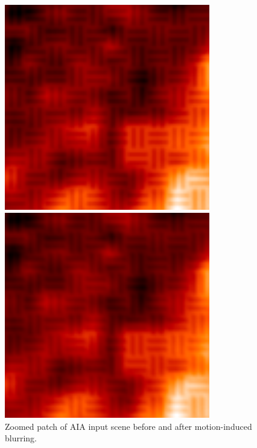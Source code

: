 \documentclass[tocnosub,noragright,centerchapter,12pt]{uiucecethesis09}
\begin{document}
\begin{figure}
  \centering
  \begin{minipage}{.5\textwidth}
    \centering
    \includegraphics[width=0.8\textwidth]{figures/aia_modulate_zoom_blur.png}
  \end{minipage}%
  \begin{minipage}{.5\textwidth}
    \centering
    \includegraphics[width=0.8\textwidth]{figures/aia_modulate_zoom_blur_blur.png}
  \end{minipage}
  \caption{Zoomed patch of AIA input scene before and after motion-induced blurring.}
  \label{fig:aia_blur_blur}
\end{figure}
\end{document}
